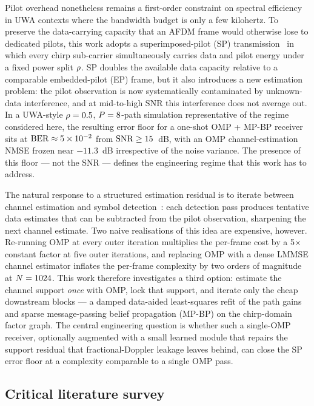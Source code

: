 Pilot overhead nonetheless remains a first-order constraint on spectral
efficiency in UWA contexts where the bandwidth budget is only a few kilohertz.
To preserve the data-carrying capacity that an AFDM frame would otherwise lose
to dedicated pilots, this work adopts a superimposed-pilot (SP)
transmission~\cite{orozco2011superimposed,tugnait2006superimposed} in which
every chirp sub-carrier simultaneously carries data and pilot energy under a
fixed power split $\rho$. SP doubles the available data capacity relative to a
comparable embedded-pilot (EP) frame, but it also introduces a new estimation
problem: the pilot observation is now systematically contaminated by
unknown-data interference, and at mid-to-high SNR this interference does not
average out. In a UWA-style $\rho = 0.5$, $P = 8$-path simulation
representative of the regime considered here, the resulting error floor for a
one-shot OMP + MP-BP receiver sits at $\mathrm{BER} \approx 5 \times 10^{-2}$ from
$\mathrm{SNR} \geq 15$~dB, with an OMP channel-estimation NMSE frozen near $-11.3$~dB
irrespective of the noise variance. The presence of this floor --- not the SNR
--- defines the engineering regime that this work has to address.

The natural response to a structured estimation residual is to iterate between
channel estimation and symbol detection~\cite{wymeersch2007iterativereceiver}:
each detection pass produces tentative data estimates that can be subtracted
from the pilot observation, sharpening the next channel estimate. Two naive
realisations of this idea are expensive, however. Re-running OMP at every outer
iteration multiplies the per-frame cost by a 5$\times$ constant factor at five
outer iterations, and replacing OMP with a dense LMMSE channel estimator
inflates the per-frame complexity by two orders of magnitude at $N = 1024$.
This work therefore investigates a third option: estimate the channel support
\emph{once} with OMP, lock that support, and iterate only the cheap downstream
blocks --- a damped data-aided least-squares refit of the path gains and sparse
message-passing belief propagation (MP-BP) on the chirp-domain factor graph.
The central engineering question is whether such a single-OMP receiver,
optionally augmented with a small learned module that repairs the support
residual that fractional-Doppler leakage leaves behind, can close the SP error
floor at a complexity comparable to a single OMP pass.


\subsection{Critical literature survey}
\label{ssec:lit}

